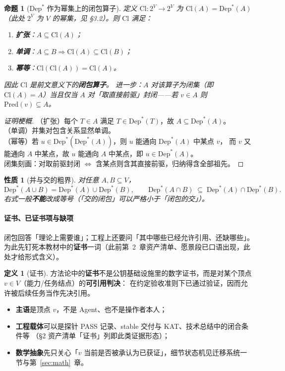 \documentclass[UTF8,a4paper,11pt]{ctexart}
\theoremstyle{definition}
\newtheorem{definition}{定义}[section]
\theoremstyle{plain}
\newtheorem{proposition}{命题}[section]
\newtheorem{property}{性质}[section]
\theoremstyle{remark}
\numberwithin{figure}{section}
\numberwithin{table}{section}
\begin{document}
\begin{proposition}[$\mathrm{Dep}^*$ 作为幂集上的闭包算子]
定义 $\mathrm{Cl}:2^{V}\to 2^{V}$ 为 $\mathrm{Cl}(A)=\mathrm{Dep}^*(A)$
（此处 $2^{V}$ 为 $V$ 的幂集，见 §3.2）。则 $\mathrm{Cl}$ 满足：
\begin{enumerate}
  \item \textbf{扩张}：$A\subseteq\mathrm{Cl}(A)$；
  \item \textbf{单调}：$A\subseteq B\Rightarrow\mathrm{Cl}(A)\subseteq\mathrm{Cl}(B)$；
  \item \textbf{幂等}：$\mathrm{Cl}(\mathrm{Cl}(A))=\mathrm{Cl}(A)$。
\end{enumerate}
因此 $\mathrm{Cl}$ 是前文意义下的\textbf{闭包算子}。
进一步：$A$ 对该算子为闭集（即 $\mathrm{Cl}(A)=A$）当且仅当
$A$ 对「取直接前驱」封闭——若 $v\in A$ 则 $\mathrm{Pred}(v)\subseteq A$。
\end{proposition}
\begin{proof}[证明梗概]
（扩张）每个 $T\in A$ 满足 $T\in\mathrm{Dep}^*(T)$，故 $A\subseteq\mathrm{Dep}^*(A)$。\\
（单调）并集对包含关系显然单调。\\
（幂等）若 $u\in\mathrm{Dep}^*(\mathrm{Dep}^*(A))$，则 $u$ 能通向 $\mathrm{Dep}^*(A)$ 中某点 $v$，
而 $v$ 又能通向 $A$ 中某点，故 $u$ 能通向 $A$ 中某点，即 $u\in\mathrm{Dep}^*(A)$。\\
闭集刻画：对取前驱封闭 $\Leftrightarrow$ 含某点则含其直接前驱，归纳得含全部祖先。
\end{proof}

\begin{property}[并与交的粗界]
对任意 $A,B\subseteq V$，
\[
\mathrm{Dep}^*(A\cup B)=\mathrm{Dep}^*(A)\cup\mathrm{Dep}^*(B),
\qquad
\mathrm{Dep}^*(A\cap B)\;\subseteq\;\mathrm{Dep}^*(A)\cap\mathrm{Dep}^*(B).
\]
右式一般\textbf{不能}改成等号（「交的闭包」可以严格小于「闭包的交」）。
\end{property}

\paragraph{证书、已证书项与缺项}
闭包回答「理论上需要谁」；工程上还要问「其中哪些已经允许引用、还缺哪些」。
为此先钉死本教材中的\textbf{证书}一词（此前第~2~章资产清单、愿景段已口语出现，此处才给形式含义）。

\begin{definition}[证书]
方法论中的\textbf{证书}不是公钥基础设施里的数字证书，而是对某个顶点 $v\in V$（能力/任务结点）的\textbf{可引用判决}：
在约定验收准则下已通过验证，因而允许被后续任务当作先决引用。
\begin{itemize}
  \item \textbf{主语}是顶点 $v$，不是 Agent、也不是操作者本人；
  \item \textbf{工程载体}可以是探针 PASS 记录、stable 交付与 KAT、技术总结中的闭合条件等
        （§2 资产清单「证书」列即此类证据形态）；
  \item \textbf{数学抽象}先只关心「$v$ 当前是否被承认为已获证」，细节状态机见迁移系统一节与第~\ref{sec:math}~章。
\end{itemize}
\end{definition}
\end{document}
